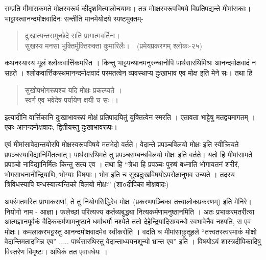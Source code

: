 सम्प्रति मीमांसकमते मोक्षस्वरूपं कीदृशमित्यालोचयामः। तत्र मोाक्षस्वरूपविषये विप्रतिपद्यन्ते मीमांसकाः। भाट्टास्त्वानन्दमोक्षवादिनः सन्तीति मानमेयोदये स्पष्टमुक्तम्-
\begin{verse}
दुःखात्यन्तसमुच्छेदे सति प्रागात्मवर्तिनः।\\
सुखस्य मनसा भुक्तिर्मुक्तिरुक्ता कुमारिलैः।। (प्रमेयप्रकरणम् श्लोकः-२५)
\end{verse}
कथनस्यास्य मूलं श्लोकवार्त्तिकमस्ति । किन्तु भाट्टपन्थानमनुरुन्धानोपि पार्थसारथिमिश्रः आनन्दमोक्षवादं न सहते । श्लोकवार्त्तिकस्थमानन्दमोक्षवादं परमतत्वेन व्यवस्थाप्य दुःखाभाव एव मोक्ष इति मेने सः। तथा हि
\begin{verse}
सुखोपभोगरूपश्च यदि मोक्षः प्रकल्प्यते ।\\
स्वर्ग एव भवेदेष पर्यायेण क्षयी च सः।।
\end{verse}
इत्यादीनि वार्त्तिकानि दुःखाभावरूपं मोक्षं प्रतिपादयितुं युक्तित्वेन स्मरति । एतावता भाट्टेषु मतद्वयमागतम् । एकः आनन्दमोक्षवादः, द्वितीयस्तु दुःखाभावरूपः।

एवं मीमांसावेदान्तयोरपि मोक्षस्वरूपविषये मतभेदो वर्तते। वेदान्ते प्रपञ्चविलयो मोक्षः इति स्वीक्रियते प्रपञ्चस्याविद्यानिर्मितत्वात्। पार्थसारथिमते तु प्रपञ्चसम्बन्धविलयो मोक्षः इति वर्तते। यतो हि मीमांसामते प्रपञ्चो नाविद्यानिर्मितः किन्तु सत्य एव । तथा हि  “त्रेधा हि प्रपञ्चः पुरुषं बध्नाति भोगायतनं  शरीरं, भोगसाधनानीन्द्रियाणि, भोग्याः विषयाः। भोग इति च सुखदुःखविषयोऽपरोक्षानुभव उच्यते । तदस्य त्रिविधस्यापि बन्धस्यात्यन्तिको विलयो मोक्षः” (शा०दीपिका मोक्षवादः)

अपरंमतमस्ति प्राभाकराणां, ते तु नियोगसिद्धिरेव मोक्षः (प्रकरणपञ्चिका तत्त्वालोकप्रकरणम्) इति मेनिरे। नियोगो नाम - आज्ञा। फलेच्छां परित्यज्य कर्तव्यबुद्ध्या नित्यकर्मणामनुष्ठानमिति । अतः प्रभाकरमतरीत्या आत्मज्ञानपूर्वकं वैदिककर्मणामनुष्ठाने धर्माधर्मौ नश्येते ततो देहेन्द्रियादिसम्बन्धो स्वभावेनैव नश्यति, स एव मोक्षः। कमलाकरभट्टस्तु आनन्दमोक्षवादमेव स्वीकरोति । वदति च मीमांसाकुतूहले “तत्त्वतस्त्वस्माकं मोक्षो वेदान्तिमतादभिन्न एव” ..... पार्थसारथिस्तु वेदान्ताध्ययनशून्यो भ्रान्त एव” इति । विषयोऽयं शास्त्रदीपिकादिषु विस्तरेण विमृष्टः। अधिकं तत एवावधेयः ।

